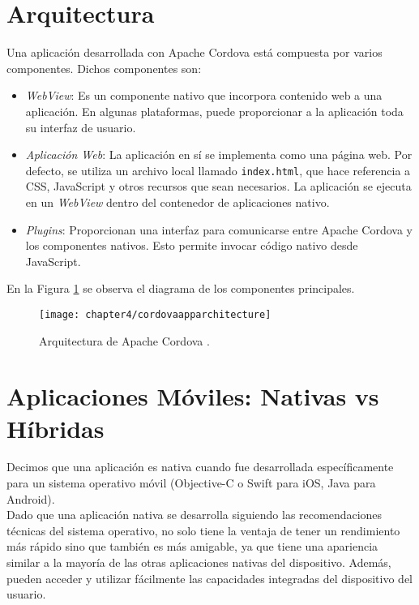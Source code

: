 \section{Arquitectura}
Una aplicación desarrollada con Apache Cordova está compuesta por varios componentes. Dichos componentes son:
\begin{itemize}
    \item \emph{WebView}: Es un componente nativo que incorpora contenido web a una aplicación. En algunas plataformas, puede proporcionar a la aplicación toda su interfaz de usuario.
    \item \emph{Aplicación Web}: La aplicación en sí se implementa como una página web. Por defecto, se utiliza un archivo local llamado \texttt{index.html}, que hace referencia a CSS, JavaScript y otros recursos que sean necesarios. La aplicación se ejecuta en un \textit{WebView} dentro del contenedor de aplicaciones nativo.
    \item \emph{Plugins}: Proporcionan una interfaz para comunicarse entre Apache Cordova y los componentes nativos. Esto permite invocar código nativo desde JavaScript.
\end{itemize}
En la Figura \ref{fig:ch05:cordova-arch} se observa el diagrama de los componentes principales.
\begin{figure}[hbtp]
	\begin{center}
		\texttt{[image: chapter4/cordovaapparchitecture]}
	    \caption{Arquitectura de Apache Cordova \cite{ACO}.}
	    \label{fig:ch05:cordova-arch}
    \end{center}
\end{figure}
\section{Aplicaciones Móviles: Nativas vs Híbridas}
Decimos que una aplicación es nativa cuando fue desarrollada específicamente para un sistema operativo móvil (Objective-C o Swift para iOS, Java para Android).\\

Dado que una aplicación nativa se desarrolla siguiendo las recomendaciones técnicas del sistema operativo, no solo tiene la ventaja de tener un rendimiento más rápido sino que también es más amigable, ya que tiene una apariencia similar a la mayoría de las otras aplicaciones nativas del dispositivo. Además, pueden acceder y utilizar fácilmente las capacidades integradas del dispositivo del usuario.\\

